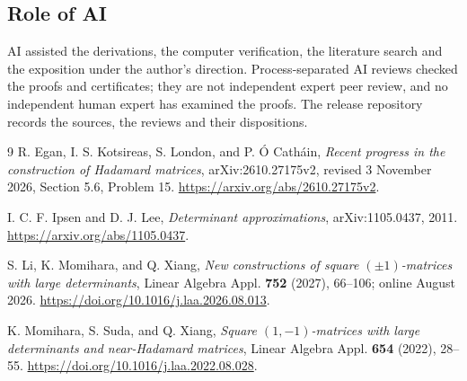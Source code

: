 \documentclass[11pt]{article}
\begin{document}
\subsection*{Role of AI}
AI assisted the derivations, the computer verification, the literature
search and the exposition under the author's direction. Process-separated
AI reviews checked the proofs and certificates; they are not independent
expert peer review, and no independent human expert has examined the
proofs. The release repository records the sources, the reviews and their
dispositions.

\begin{thebibliography}{9}
R. Egan, I. S. Kotsireas, S. London, and P. \'O Cath\'ain,
\emph{Recent progress in the construction of Hadamard matrices},
arXiv:2610.27175v2, revised 3 November 2026, Section 5.6, Problem 15.
\url{https://arxiv.org/abs/2610.27175v2}.

I. C. F. Ipsen and D. J. Lee,
\emph{Determinant approximations}, arXiv:1105.0437, 2011.
\url{https://arxiv.org/abs/1105.0437}.

S. Li, K. Momihara, and Q. Xiang,
\emph{New constructions of square $(\pm1)$-matrices with large determinants},
Linear Algebra Appl. \textbf{752} (2027), 66--106; online August 2026.
\url{https://doi.org/10.1016/j.laa.2026.08.013}.

K. Momihara, S. Suda, and Q. Xiang,
\emph{Square $(1,-1)$-matrices with large determinants and near-Hadamard matrices},
Linear Algebra Appl. \textbf{654} (2022), 28--55.
\url{https://doi.org/10.1016/j.laa.2022.08.028}.
\end{thebibliography}
\end{document}
